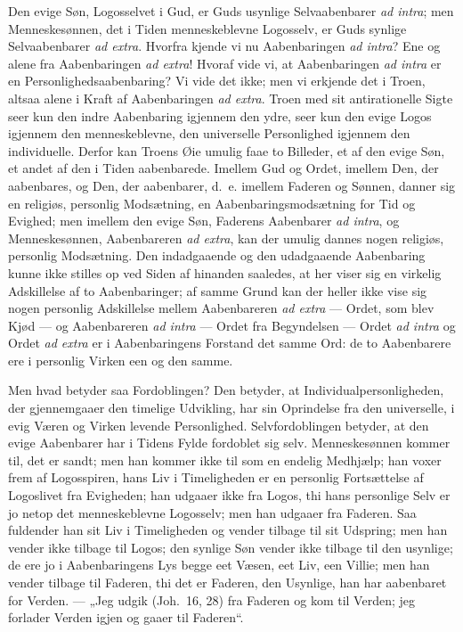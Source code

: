 \documentclass[12pt]{book}
\begin{document}
Den evige Søn, Logosselvet i Gud, er Guds usynlige Selvaabenbarer
\textit{ad intra}; men Menneskesønnen, det i Tiden menneskeblevne
Logosselv, er Guds synlige Selvaabenbarer \textit{ad extra}. Hvorfra
kjende vi nu Aabenbaringen \textit{ad intra}? Ene og alene fra
Aabenbaringen \textit{ad extra}! Hvoraf vide vi, at Aabenbaringen
\textit{ad intra} er en Personlighedsaabenbaring? Vi vide det ikke;
men vi erkjende det i Troen, altsaa alene i Kraft af Aabenbaringen
\textit{ad extra}. Troen med sit antirationelle Sigte seer kun den
indre Aabenbaring igjennem den ydre, seer kun den evige Logos
igjennem den menneskeblevne, den universelle Personlighed igjennem
den individuelle. Derfor kan Troens Øie umulig faae to Billeder, et
af den evige Søn, et andet af den i Tiden aabenbarede. Imellem Gud
og Ordet, imellem Den, der aabenbares, og Den, der aabenbarer,
d.\ e. imellem Faderen og Sønnen, danner sig en religiøs, personlig
Modsætning, en Aabenbaringsmodsætning for Tid og Evighed; men
imellem den evige Søn, Faderens Aabenbarer \textit{ad intra}, og
Menneskesønnen, Aabenbareren \textit{ad extra}, kan der umulig
dannes nogen religiøs, personlig Modsætning. Den indadgaaende og den
udadgaaende Aabenbaring kunne ikke stilles op ved Siden af hinanden
saaledes, at her viser sig en virkelig Adskillelse af to
Aabenbaringer; af samme Grund kan der heller ikke vise sig nogen
personlig Adskillelse mellem Aabenbareren \textit{ad extra} ---
Ordet, som blev Kjød --- og Aabenbareren \textit{ad intra} --- Ordet
fra Begyndelsen --- Ordet \textit{ad intra} og
Ordet \textit{ad extra} er i Aabenbaringens Forstand det samme Ord:
de to Aabenbarere ere i personlig Virken een og den samme.

Men hvad betyder saa Fordoblingen? Den betyder, at
Individualpersonligheden, der gjennemgaaer den timelige Udvikling,
har sin Oprindelse fra den universelle, i evig Væren og Virken
levende Personlighed. Selvfordoblingen betyder, at den evige
Aabenbarer har i Tidens Fylde fordoblet sig selv. Menneskesønnen
kommer til, det er sandt; men han kommer ikke til som en endelig
Medhjælp; han voxer frem af Logosspiren, hans Liv i Timeligheden er
en personlig Fortsættelse af Logoslivet fra Evigheden; han udgaaer
ikke fra Logos, thi hans personlige Selv er jo netop det
menneskeblevne Logosselv; men han udgaaer fra Faderen. Saa fuldender
han sit Liv i Timeligheden og vender tilbage til sit Udspring; men
han vender ikke tilbage til Logos; den synlige Søn vender ikke
tilbage til den usynlige; de ere jo i Aabenbaringens Lys begge eet
Væsen, eet Liv, een Villie; men han vender tilbage til Faderen, thi
det er Faderen, den Usynlige, han har aabenbaret for Verden. ---
„Jeg udgik (Joh.\ 16, 28) fra Faderen og kom til Verden; jeg
forlader Verden igjen og gaaer til Faderen“.
\end{document}
